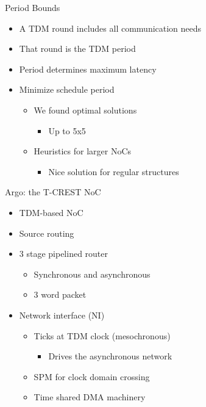 \documentclass[17pt]{beamer}
\begin{document}
\begin{frame}{Period Bounds}
  \begin{itemize}
  \item A TDM round includes all communication needs
  \item That round is the TDM period
  \item Period determines maximum latency
  \item Minimize schedule period
    \begin{itemize}
    \item We found optimal solutions
      \begin{itemize}
      \item Up to 5x5
      \end{itemize}
    \item Heuristics for larger NoCs
      \begin{itemize}
      \item Nice solution for regular structures
      \end{itemize}
    \end{itemize}
  \end{itemize}  
\end{frame}

\begin{frame}{Argo: the T-CREST NoC}
  \begin{itemize}
  \item TDM-based NoC
  \item Source routing
  \item 3 stage pipelined router
    \begin{itemize}
    \item Synchronous and asynchronous
    \item 3 word packet
    \end{itemize}
  \item Network interface (NI)
    \begin{itemize}
    \item Ticks at TDM clock (mesochronous)
      \begin{itemize}
      \item Drives the asynchronous network
      \end{itemize}
    \item SPM for clock domain crossing    
    \item Time shared DMA machinery
    \end{itemize}
  \end{itemize}  
\end{frame}
\end{document}
